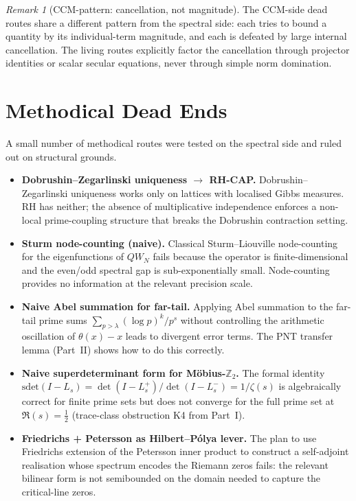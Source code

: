 \documentclass[12pt,a4paper]{article}
\theoremstyle{definition}
\theoremstyle{remark}
\newtheorem{remark}[theorem]{Remark}
\begin{document}
\begin{remark}[CCM-pattern: cancellation, not magnitude]
\label{rem:ccm-pattern}
The CCM-side dead routes share a different pattern from the spectral
side: each tries to bound a quantity by its individual-term magnitude,
and each is defeated by large internal cancellation. The living routes
explicitly factor the cancellation through projector identities or
scalar secular equations, never through simple norm domination.
\end{remark}


\section{Methodical Dead Ends}
\label{sec:methodical}

A small number of methodical routes were tested on the spectral side and
ruled out on structural grounds.

\begin{itemize}
  \item \textbf{Dobrushin--Zegarlinski uniqueness $\to$ RH-CAP.}
    Dobrushin--Zegarlinski uniqueness works only on lattices with
    localised Gibbs measures. RH has neither; the absence of
    multiplicative independence enforces a non-local prime-coupling
    structure that breaks the Dobrushin contraction setting.

  \item \textbf{Sturm node-counting (naive).} Classical Sturm--Liouville
    node-counting for the eigenfunctions of $QW_N$ fails because the
    operator is finite-dimensional and the even/odd spectral gap is
    sub-exponentially small. Node-counting provides no information at the
    relevant precision scale.

  \item \textbf{Naive Abel summation for far-tail.} Applying Abel
    summation to the far-tail prime sums
    $\sum_{p>\lambda} (\log p)^k / p^s$ without controlling the
    arithmetic oscillation of $\theta(x)-x$ leads to divergent error
    terms. The PNT transfer lemma (Part~II) shows how to do this
    correctly.

  \item \textbf{Naive superdeterminant form for M\"obius-$\mathbb{Z}_2$.}
    The formal identity
    $\mathrm{sdet}(I - L_s) = \det(I-L_s^+)/\det(I-L_s^-) = 1/\zeta(s)$
    is algebraically correct for finite prime sets but does not converge
    for the full prime set at $\Re(s) = \tfrac{1}{2}$ (trace-class
    obstruction K4 from Part~I).

  \item \textbf{Friedrichs + Petersson as Hilbert--P\'olya lever.}
    The plan to use Friedrichs extension of the Petersson inner product
    to construct a self-adjoint realisation whose spectrum encodes the
    Riemann zeros fails: the relevant bilinear form is not semibounded
    on the domain needed to capture the critical-line zeros.
\end{itemize}
\end{document}
